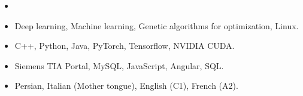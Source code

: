 \documentclass[10pt,a4paper,ragged2e]{altacv}
\begin{document}
\smallskip
\begin{itemize}
  \item {}
\end{itemize}

\smallskip
\begin{itemize}
\item Deep learning, Machine learning, Genetic algorithms for optimization, Linux.
\smallskip
\item C++, Python, Java, PyTorch, Tensorflow, NVIDIA CUDA.
\smallskip
\item Siemens TIA Portal, MySQL, JavaScript, Angular, SQL.
\smallskip
\item Persian, Italian (Mother tongue), English (C1), French (A2).
\end{itemize}
\clearpage
\nocite{*}
\end{document}
